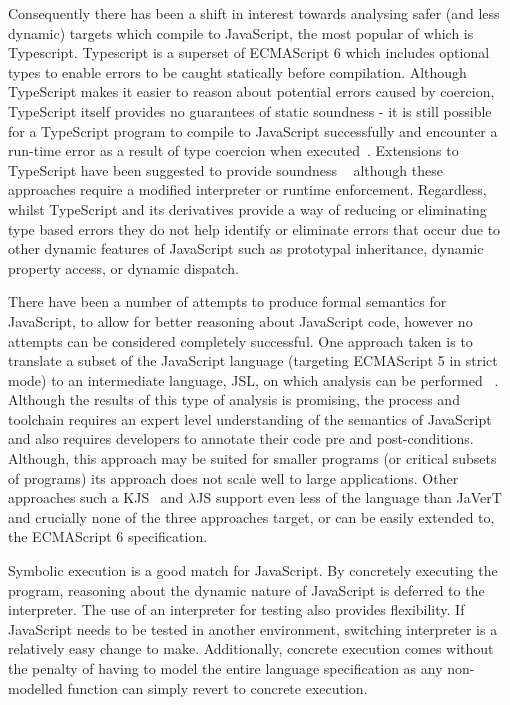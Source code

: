 \documentclass[]{final_report}
\begin{document}
Consequently there has been a shift in interest towards analysing safer (and less dynamic) targets which compile to JavaScript, the most popular of which is Typescript. Typescript is a superset of ECMAScript 6 which includes optional types to enable errors to be caught statically before compilation. Although TypeScript makes it easier to reason about potential errors caused by coercion, TypeScript itself provides no guarantees of static soundness - it is still possible for a TypeScript program to compile to JavaScript successfully and encounter a run-time error as a result of type coercion when executed~\cite{bierman2014understanding}. Extensions to TypeScript have been suggested to provide soundness ~\cite{richards2015concrete, rastogi2015safe} although these approaches require a modified interpreter or runtime enforcement. Regardless, whilst TypeScript and its derivatives provide a way of reducing or eliminating type based errors they do not help identify or eliminate errors that occur due to other dynamic features of JavaScript such as prototypal inheritance, dynamic property access, or dynamic dispatch.

There have been a number of attempts to produce formal semantics for JavaScript, to allow for better reasoning about JavaScript code, however no attempts can be considered completely successful. One approach taken is to translate a subset of the JavaScript language (targeting ECMAScript 5 in strict mode) to an intermediate language, JSL, on which analysis can be performed ~\cite{gardner2012towards}. Although the results of this type of analysis is promising, the process and toolchain requires an expert level understanding of the semantics of JavaScript and also requires developers to annotate their code pre and post-conditions. Although, this approach may be suited for smaller programs (or critical subsets of programs) its approach does not scale well to large applications. Other approaches such a KJS~\cite{park2015kjs} and \ensuremath{\lambda}JS\cite{guha2010essence} support even less of the language than JaVerT and crucially none of the three approaches target, or can be easily extended to, the ECMAScript 6 specification.

Symbolic execution is a good match for JavaScript. By concretely executing the program, reasoning about the dynamic nature of JavaScript is deferred to the interpreter. The use of an interpreter for testing also provides flexibility. If JavaScript needs to be tested in another environment, switching interpreter is a relatively easy change to make. Additionally, concrete execution comes without the penalty of having to model the entire language specification as any non-modelled function can simply revert to concrete execution.
\end{document}

